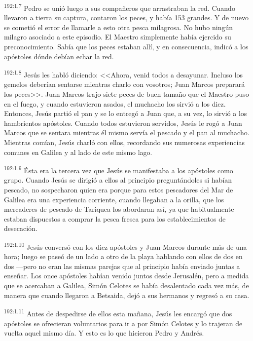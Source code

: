 \par 
\textsuperscript{192:1.7} Pedro se unió luego a sus compañeros que arrastraban la red. Cuando llevaron a tierra su captura, contaron los peces, y había 153 grandes. Y de nuevo se cometió el error de llamarle a esto otra pesca milagrosa. No hubo ningún milagro asociado a este episodio. El Maestro simplemente había ejercido su preconocimiento. Sabía que los peces estaban allí, y en consecuencia, indicó a los apóstoles dónde debían echar la red.

\par 
\textsuperscript{192:1.8} Jesús les habló diciendo: <<Ahora, venid todos a desayunar. Incluso los gemelos deberían sentarse mientras charlo con vosotros; Juan Marcos preparará los peces>>. Juan Marcos trajo siete peces de buen tamaño que el Maestro puso en el fuego, y cuando estuvieron asados, el muchacho los sirvió a los diez. Entonces, Jesús partió el pan y se lo entregó a Juan que, a su vez, lo sirvió a los hambrientos apóstoles. Cuando todos estuvieron servidos, Jesús le rogó a Juan Marcos que se sentara mientras él mismo servía el pescado y el pan al muchacho. Mientras comían, Jesús charló con ellos, recordando sus numerosas experiencias comunes en Galilea y al lado de este mismo lago.

\par 
\textsuperscript{192:1.9} Ésta era la tercera vez que Jesús se manifestaba a los apóstoles como grupo. Cuando Jesús se dirigió a ellos al principio preguntándoles si habían pescado, no sospecharon quien era porque para estos pescadores del Mar de Galilea era una experiencia corriente, cuando llegaban a la orilla, que los mercaderes de pescado de Tariquea los abordaran así, ya que habitualmente estaban dispuestos a comprar la pesca fresca para los establecimientos de desecación.

\par 
\textsuperscript{192:1.10} Jesús conversó con los diez apóstoles y Juan Marcos durante más de una hora; luego se paseó de un lado a otro de la playa hablando con ellos de dos en dos ---pero no eran las mismas parejas que al principio había enviado juntas a enseñar. Los once apóstoles habían venido juntos desde Jerusalén, pero a medida que se acercaban a Galilea, Simón Celotes se había desalentado cada vez más, de manera que cuando llegaron a Betsaida, dejó a sus hermanos y regresó a su casa.

\par 
\textsuperscript{192:1.11} Antes de despedirse de ellos esta mañana, Jesús les encargó que dos apóstoles se ofrecieran voluntarios para ir a por Simón Celotes y lo trajeran de vuelta aquel mismo día. Y esto es lo que hicieron Pedro y Andrés.

